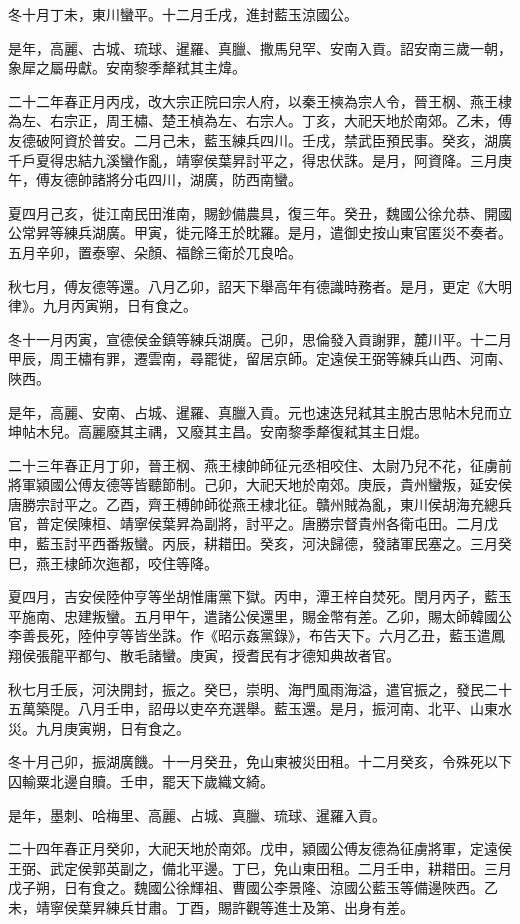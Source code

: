 \begin{pinyinscope}
冬十月丁未，東川蠻平。十二月壬戌，進封藍玉涼國公。

是年，高麗、古城、琉球、暹羅、真臘、撒馬兒罕、安南入貢。詔安南三歲一朝，象犀之屬毋獻。安南黎季犛弒其主煒。

二十二年春正月丙戌，改大宗正院曰宗人府，以秦王樉為宗人令，晉王㭎、燕王棣為左、右宗正，周王橚、楚王楨為左、右宗人。丁亥，大祀天地於南郊。乙未，傅友德破阿資於普安。二月己未，藍玉練兵四川。壬戌，禁武臣預民事。癸亥，湖廣千戶夏得忠結九溪蠻作亂，靖寧侯葉昇討平之，得忠伏誅。是月，阿資降。三月庚午，傅友德帥諸將分屯四川，湖廣，防西南蠻。

夏四月己亥，徙江南民田淮南，賜鈔備農具，復三年。癸丑，魏國公徐允恭、開國公常昇等練兵湖廣。甲寅，徙元降王於眈羅。是月，遣御史按山東官匿災不奏者。五月辛卯，置泰寧、朵顏、福餘三衛於兀良哈。

秋七月，傅友德等還。八月乙卯，詔天下舉高年有德識時務者。是月，更定《大明律》。九月丙寅朔，日有食之。

冬十一月丙寅，宣德侯金鎮等練兵湖廣。己卯，思倫發入貢謝罪，麓川平。十二月甲辰，周王橚有罪，遷雲南，尋罷徙，留居京師。定遠侯王弼等練兵山西、河南、陜西。

是年，高麗、安南、占城、暹羅、真臘入貢。元也速迭兒弒其主脫古思帖木兒而立坤帖木兒。高麗廢其主禑，又廢其主昌。安南黎季犛復弒其主日焜。

二十三年春正月丁卯，晉王㭎、燕王棣帥師征元丞相咬住、太尉乃兒不花，征虜前將軍潁國公傅友德等皆聽節制。己卯，大祀天地於南郊。庚辰，貴州蠻叛，延安侯唐勝宗討平之。乙酉，齊王榑帥師從燕王棣北征。贛州賊為亂，東川侯胡海充總兵官，普定侯陳桓、靖寧侯葉昇為副將，討平之。唐勝宗督貴州各衛屯田。二月戊申，藍玉討平西番叛蠻。丙辰，耕耤田。癸亥，河決歸德，發諸軍民塞之。三月癸巳，燕王棣師次迤都，咬住等降。

夏四月，吉安侯陸仲亨等坐胡惟庸黨下獄。丙申，潭王梓自焚死。閏月丙子，藍玉平施南、忠建叛蠻。五月甲午，遣諸公侯還里，賜金幣有差。乙卯，賜太師韓國公李善長死，陸仲亨等皆坐誅。作《昭示姦黨錄》，布告天下。六月乙丑，藍玉遣鳳翔侯張龍平都勻、散毛諸蠻。庚寅，授耆民有才德知典故者官。

秋七月壬辰，河決開封，振之。癸巳，崇明、海門風雨海溢，遣官振之，發民二十五萬築隄。八月壬申，詔毋以吏卒充選舉。藍玉還。是月，振河南、北平、山東水災。九月庚寅朔，日有食之。

冬十月己卯，振湖廣饑。十一月癸丑，免山東被災田租。十二月癸亥，令殊死以下囚輸粟北邊自贖。壬申，罷天下歲織文綺。

是年，墨刺、哈梅里、高麗、占城、真臘、琉球、暹羅入貢。

二十四年春正月癸卯，大祀天地於南郊。戊申，潁國公傅友德為征虜將軍，定遠侯王弼、武定侯郭英副之，備北平邊。丁巳，免山東田租。二月壬申，耕耤田。三月戊子朔，日有食之。魏國公徐輝祖、曹國公李景隆、涼國公藍玉等備邊陜西。乙未，靖寧侯葉昇練兵甘肅。丁酉，賜許觀等進士及第、出身有差。


\end{pinyinscope}
